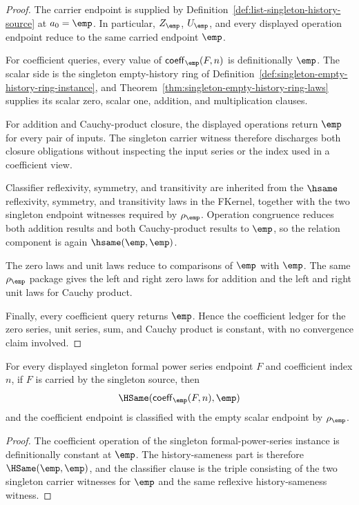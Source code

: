 \begin{proof}
The carrier endpoint is supplied by Definition~\ref{def:list-singleton-history-source}
at $a_0=\emp$. In particular, $Z_{\emp}$, $U_{\emp}$, and every displayed
operation endpoint reduce to the same carried endpoint $\emp$.

For coefficient queries, every value of $\mathsf{coeff}_{\emp}(F,n)$ is
definitionally $\emp$. The scalar side is the singleton empty-history ring of
Definition~\ref{def:singleton-empty-history-ring-instance}, and
Theorem~\ref{thm:singleton-empty-history-ring-laws} supplies its scalar zero,
scalar one, addition, and multiplication clauses.

For addition and Cauchy-product closure, the displayed operations return
$\emp$ for every pair of inputs. The singleton carrier witness therefore
discharges both closure obligations without inspecting the input series or the
index used in a coefficient view.

Classifier reflexivity, symmetry, and transitivity are inherited from the
$\hsame$ reflexivity, symmetry, and transitivity laws in the FKernel, together
with the two singleton endpoint witnesses required by $\rho_{\emp}$. Operation
congruence reduces both addition results and both Cauchy-product results to
$\emp$, so the relation component is again $\hsame(\emp,\emp)$.

The zero laws and unit laws reduce to comparisons of $\emp$ with $\emp$.
The same $\rho_{\emp}$ package gives the left and right zero laws for addition
and the left and right unit laws for Cauchy product.

Finally, every coefficient query returns $\emp$. Hence the coefficient ledger
for the zero series, unit series, sum, and Cauchy product is constant, with no
convergence claim involved.
\end{proof}

\begin{theorem}
\label{thm:fps-singleton-coeff-empty-ledger}
For every displayed singleton formal power series endpoint $F$ and coefficient
index $n$, if $F$ is carried by the singleton source, then
$$
\HSame(\mathsf{coeff}_{\emp}(F,n),\emp)
$$
and the coefficient endpoint is classified with the empty scalar endpoint by
$\rho_{\emp}$.
\end{theorem}
\begin{proof}
The coefficient operation of the singleton formal-power-series instance is
definitionally constant at $\emp$. The history-sameness part is therefore
$\HSame(\emp,\emp)$, and the classifier clause is the triple consisting of the
two singleton carrier witnesses for $\emp$ and the same reflexive
history-sameness witness.
\end{proof}

